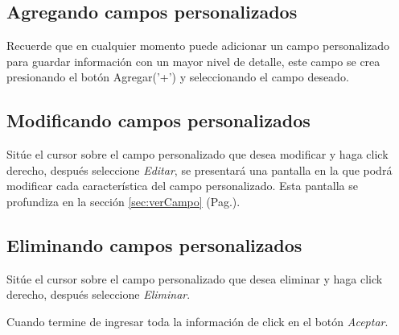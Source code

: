 \subsection{Agregando campos personalizados}
\label{sec:agregarCamposPlantilla}
Recuerde que en cualquier momento puede adicionar un campo personalizado para guardar informaci\'on con un mayor nivel de detalle, este campo se crea presionando el bot\'on Agregar('+') y seleccionando el campo deseado.

\subsection{Modificando campos personalizados}
\label{sec:modificarCamposPlantilla}
Sit\'ue el cursor sobre el campo personalizado que desea modificar y haga click derecho, despu\'es seleccione \emph{Editar},
se presentar\'a una pantalla en la que podr\'a modificar cada caracter\'istica
del campo personalizado. Esta pantalla se profundiza en la secci\'on
\ref{sec:verCampo} (Pag.\pageref{sec:verCampo}).

\subsection{Eliminando campos personalizados}
\label{sec:eliminarCamposPlantilla}
Sit\'ue el cursor sobre el campo personalizado que desea eliminar y haga click derecho, despu\'es seleccione \emph{Eliminar}.

Cuando termine de ingresar toda la informaci\'on de click en el bot\'on \emph{Aceptar}.
